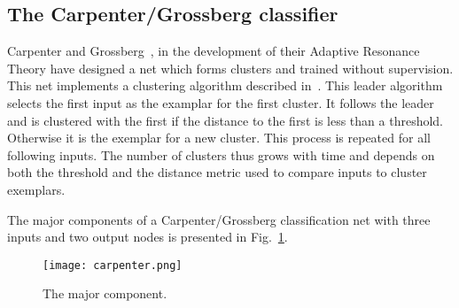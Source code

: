 \documentclass[10pt,twocolumn,letterpaper]{article}
\begin{document}
\subsection{The Carpenter/Grossberg classifier}
\par Carpenter and Grossberg~\cite{carpenter1987neural}, in the development of their Adaptive Resonance Theory have designed a net which forms clusters and trained without supervision. This net implements a clustering algorithm described in~\cite{Hartigan1975Clustering}. This leader algorithm selects the first input as the examplar for the first cluster. It follows the leader and is clustered with the first if the distance to the first is less than a threshold. Otherwise it is the exemplar for a new cluster. This process is repeated for all following inputs. The number of clusters thus grows with time and depends on both the threshold and the distance metric used to compare inputs to cluster exemplars.
\par The major components of a Carpenter/Grossberg classification net with three inputs and two output nodes is presented in Fig.~\ref{carp}.
\begin{figure}[htbp]
 \centering{}
\texttt{[image: carpenter.png]}\\
 \caption{The major component.}
\label{carp}
\end{figure}
 
 
\end{document}
